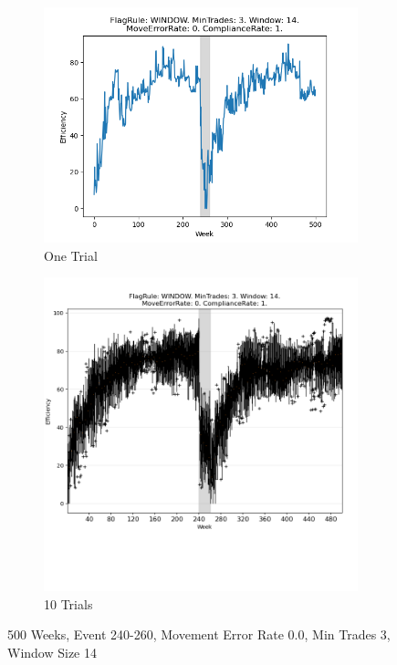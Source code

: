 \documentclass{article}%
\begin{document}
%


\begin{figure}[!htb]%
\begin{subfigure}[b]{0.45\linewidth}%
\includegraphics[width=\linewidth]{2056fr_WINDOW_mt_3_ws_14_er_0_cr_1_t1.png}%
\caption{One Trial}%
\end{subfigure}%
\begin{subfigure}[b]{0.45\linewidth}%
\includegraphics[clip,width=\linewidth,trim=0 4cm 0 0]{2056fr_WINDOW_mt_3_ws_14_er_0_cr_1_t10.png}%
\caption{10 Trials}%
\end{subfigure}%
\caption{500 Weeks, Event 240{-}260, Movement Error Rate 0.0, Min Trades 3, Window Size 14}%
\end{figure}
\end{document}
